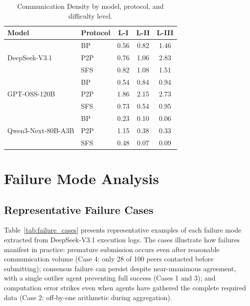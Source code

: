 \begin{table}[t]
\centering
\small
\renewcommand{\arraystretch}{1.1}
\begin{tabular}{ll ccc}
\toprule
\textbf{Model} & \textbf{Protocol} & \textbf{L-I} & \textbf{L-II} & \textbf{L-III} \\
\midrule
\multirow{3}{*}{DeepSeek-V3.1}
& BP  & 0.56 & 0.82 & 1.46 \\
& P2P & 0.76 & 1.06 & 2.83 \\
& SFS & 0.82 & 1.08 & 1.51 \\
\midrule
\multirow{3}{*}{GPT-OSS-120B}
& BP  & 0.54 & 0.84 & 0.94 \\
& P2P & 1.86 & 2.15 & 2.73 \\
& SFS & 0.73 & 0.54 & 0.95 \\
\midrule
\multirow{3}{*}{Qwen3-Next-80B-A3B}
& BP  & 0.23 & 0.10 & 0.06 \\
& P2P & 1.15 & 0.38 & 0.33 \\
& SFS & 0.48 & 0.07 & 0.09 \\
\bottomrule
\end{tabular}
\caption{Communication Density by model, protocol, and difficulty level.}
\label{tab:detailed_density}
\end{table}


\section{Failure Mode Analysis}
\label{app:failure_analysis}

\subsection{Representative Failure Cases}
\label{app:failure_cases}

Table~\ref{tab:failure_cases} presents representative examples of each failure mode extracted from DeepSeek-V3.1 execution logs. The cases illustrate how failures manifest in practice: premature submission occurs even after reasonable communication volume (Case 4: only 28 of 100 peers contacted before submitting); consensus failure can persist despite near-unanimous agreement, with a single outlier agent preventing full success (Cases 1 and 3); and computation error strikes even when agents have gathered the complete required data (Case 2: off-by-one arithmetic during aggregation).

